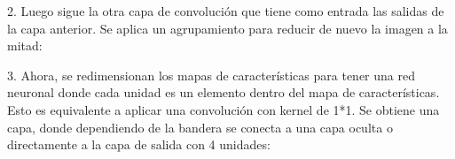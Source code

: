 %
\begin{sphinxVerbatim}[commandchars=\\\{\}]
   \PYG{p}{[}\PYG{p}{]}
  
\end{sphinxVerbatim}

2. Luego sigue la otra capa de convolución que tiene como entrada las salidas
de la capa anterior. Se aplica un agrupamiento para reducir de nuevo
la imagen a la mitad:

%
\begin{sphinxVerbatim}[commandchars=\\\{\}]
   \PYG{p}{[}\PYG{p}{]}
  
\end{sphinxVerbatim}

3. Ahora, se redimensionan los
mapas de características para tener una red neuronal donde cada unidad es un
elemento dentro del mapa de características. Esto es equivalente a aplicar
una convolución con kernel de 1*1. Se obtiene una capa, donde
dependiendo de la bandera se conecta a una capa oculta o directamente
a la capa de salida con 4 unidades:

%
\begin{sphinxVerbatim}[commandchars=\\\{\}]
  \PYG{p}{[}\PYG{p}{]}\PYG{p}{[}\PYG{p}{]}
   \PYG{p}{[}     \PYG{p}{]}
 
       
      
\end{sphinxVerbatim}


